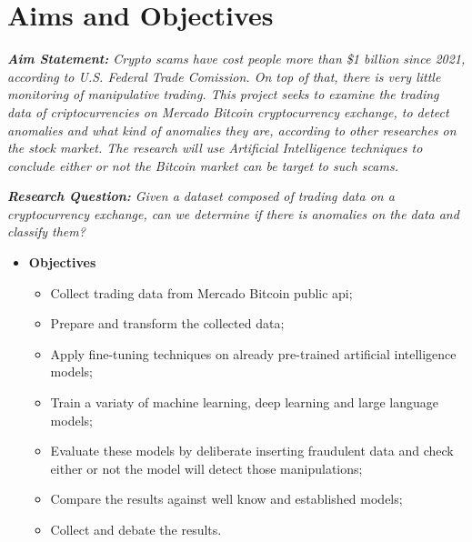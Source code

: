 \section{Aims and Objectives}
\textit{\textbf{Aim Statement:} Crypto scams have cost people more than \$1 billion since 2021, according to U.S.
Federal Trade Comission. On top of that, there is very little monitoring of manipulative trading. This project seeks to
examine the trading data of criptocurrencies on Mercado Bitcoin cryptocurrency exchange, to detect anomalies and what
kind of anomalies they are, according to other researches on the stock market. The research will use Artificial
Intelligence techniques to conclude either or not the Bitcoin market can be target to such scams.}

\textit{\textbf{Research Question:} Given a dataset composed of trading data on a cryptocurrency exchange, can we
determine if there is anomalies on the data and classify them?}

\begin{itemize}
    \item[] \textbf{Objectives}
    \begin{itemize}
        \item Collect trading data from Mercado Bitcoin public api;
        \item Prepare and transform the collected data;
        \item Apply fine-tuning techniques on already pre-trained artificial intelligence models;
        \item Train a variaty of machine learning, deep learning and large language models;
        \item Evaluate these models by deliberate inserting fraudulent data and check either or not the model will
        detect those manipulations;
        \item Compare the results against well know and established models;
        \item Collect and debate the results.
    \end{itemize}
\end{itemize}